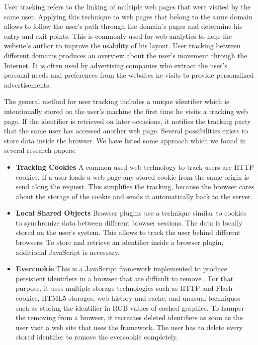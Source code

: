 	User tracking refers to the linking of multiple web pages that were visited by the same user. Applying this technique to web pages that belong to the same domain allows to follow the user's path through the domain's pages and determine his entry and exit points. This is commonly used for web analytics to help the website's author to improve the usability of his layout. User tracking between different domains produces an overview about the user's movement through the Internet. It is often used by advertising companies who extract the user's personal needs and preferences from the websites he visits to provide personalized advertisements.
		
	The general method for user tracking includes a unique identifier which is intentionally stored on the user's machine the first time he visits a tracking web page. If the identifier is retrieved on later occasions, it notifies the tracking party that the same user has accessed another web page. Several possibilities exists to store data inside the browser. We have listed some approach which we found in several research papers:
		
	\begin{itemize}
		\item \textbf{Tracking Cookies} A common used web technology to track users are HTTP cookies. If a user loads a web page any stored cookie from the same origin is send along the request. This simplifies the tracking, because the browser cares about the storage of the cookie and sends it automatically back to the server.
		
		\item \textbf{Local Shared Objects} Browser plugins use a technique similar to cookies to synchronize data between different browser sessions. The data is locally stored on the user's system. This allows to track the user behind different browsers. To store and retrieve an identifier inside a browser plugin, additional JavaScript is necessary.
		
		\item \textbf{Evercookie} This is a JavaScript framework implemented to produce persistent identifiers in a browser that are difficult to remove \cite{evercookie}. For that purpose, it uses multiple storage technologies such as HTTP and Flash cookies, HTML5 storages, web history and cache, and unusual techniques such as storing the identifier in RGB values of cached graphics. To hamper the removing from a browser, it recreates deleted identifiers as soon as the user visit a web site that uses the framework. The user has to delete every stored identifier to remove the evercookie completely. 
	\end{itemize}
	
